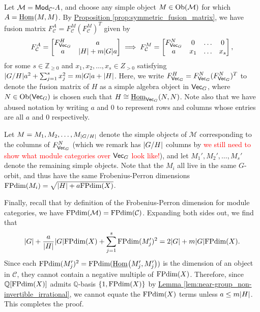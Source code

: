 \documentclass[12pt, reqno]{amsart}
\numberwithin{equation}{section}
\theoremstyle{plainspace}
\theoremstyle{definitionspace}
\theoremstyle{remarkspace}
\renewenvironment{proof}{{\noindent\textbf{Proof.}}}{\null\hfill\qedsymbol}
\DeclarePairedDelimiter{\abs}{\lvert}{\rvert}
\newcommand{\mathcat}[1]{\mathcal{#1}}
\newcommand{\Ob}{\textup{Ob}}
\newcommand{\IntHom}[2][]{
	\ifthenelse{\equal{#2}{}}
		{\underline{\textup{Hom}}_{#1}}
		{\underline{\textup{Hom}}_{#1}\!\left(#2\right)}
}
\newcommand{\textcat}[1]{\textup{\textsf{#1}}}
\newcommand{\rmodcat}[2][]{\textcat{Mod}_{#1}\textcat{-}#2}
\newcommand{\FPdim}{\textup{FPdim}}
\begin{document}
\begin{proof}
\noindent Let $\mathcat{M} = \rmodcat[\mathcat{C}]{A}$, and choose any simple object $M \in \Ob(\mathcat{M})$ for which $A = \IntHom{M, M}$. By \hyperref[prop:symmetric_fusion_matrix]{Proposition \ref*{prop:symmetric_fusion_matrix}}, we have fusion matrix $F_{\mathcat{C}}^A = F_{\mathcat{C}}^M (F_{\mathcat{C}}^M)^T$ given by
\begin{align*}
\begin{split}
F_{\mathcat{C}}^A = \begin{bmatrix}
F_{\textcat{Vec}_G}^H & a \\
a & \abs{H} + m\abs{G}a
\end{bmatrix} \implies F_{\mathcat{C}}^M = \begin{bmatrix}
F_{\textcat{Vec}_G}^N & 0 & \dots & 0 \\
a & x_1 & \dots & x_s
\end{bmatrix},
\end{split}
\end{align*}
\noindent for some $s \in \mathbb{Z}_{\geq 0}$ and $x_1, x_2, \dots, x_s \in Z_{>0}$ satisfying $\abs{G/H}a^2 + \sum_{j=1}^{s}{x_j^2} = m\abs{G}a + \abs{H}$. Here, we write $F_{\textcat{Vec}_G}^H = F_{\textcat{Vec}_G}^N(F_{\textcat{Vec}_G}^N)^T$ to denote the fusion matrix of $H$ as a simple algebra object in $\textcat{Vec}_G$, where $N \in \Ob(\textcat{Vec}_G)$ is chosen such that $H \cong \IntHom[\textcat{Vec}_G]{N, N}$. Note also that we have abused notation by writing $a$ and $0$ to represent rows and columns whose entries are all $a$ and $0$ respectively.
\newline

\noindent Let $M = M_1, M_2, \dots, M_{\abs{G/H}}$ denote the simple objects of $\mathcat{M}$ corresponding to the columns of $F_{\textcat{Vec}_G}^N$ (which we remark has $\abs{G/H}$ columns by \textcolor{red}{we still need to show what module categories over $\textcat{Vec}_G$ look like!}), and let $M_1', M_2', \dots, M_s'$ denote the remaining simple objects. Note that the $M_i$ all live in the same $G$-orbit, and thus have the same Frobenius-Perron dimensions $\FPdim(M_i) = \sqrt{\abs{H} + a\FPdim(X)}$.
\newline

\noindent Finally, recall that by definition of the Frobenius-Perron dimension for module categories, we have $\FPdim(\mathcat{M}) = \FPdim(\mathcat{C})$. Expanding both sides out, we find that
\begin{align*}
\begin{split}
\abs{G} + \frac{a}{\abs{H}}\abs{G}\FPdim(X) + \sum_{j=1}^{s}{\FPdim(M_j')^2} = 2\abs{G} + m\abs{G}\FPdim(X).
\end{split}
\end{align*}
\noindent Since each $\FPdim(M_j')^2 = \FPdim(\IntHom{M_j', M_j'})$ is the dimension of an object in $\mathcat{C}$, they cannot contain a negative multiple of $\FPdim(X)$. Therefore, since $\mathbb{Q}[\FPdim(X)]$ admits $\mathbb{Q}$-basis $\{1, \FPdim(X)\}$ by \hyperref[lem:near-group_non-invertible_irrational]{Lemma \ref*{lem:near-group_non-invertible_irrational}}, we cannot equate the $\FPdim(X)$ terms unless $a \leq m\abs{H}$. This completes the proof.
\end{proof}
\end{document}
